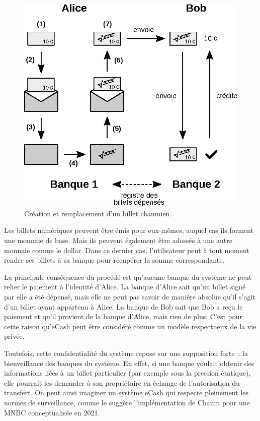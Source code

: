 \begin{figure}[h]
  \centering
  \includegraphics[scale=0.75]{img/chaumian-ecash.eps}
  \caption{Création et remplacement d'un billet chaumien.}
\end{figure}

Les billets numériques peuvent être émis pour eux-mêmes, auquel cas ils forment une monnaie de base. Mais ils peuvent également être adossés à une autre monnaie comme le dollar. Dans ce dernier cas, l'utilisateur peut à tout moment rendre ses billets à sa banque pour récupérer la somme correspondante.

La principale conséquence du procédé est qu'aucune banque du système ne peut relier le paiement à l'identité d'Alice. La banque d'Alice sait qu'un billet signé par elle a été dépensé, mais elle ne peut pas savoir de manière absolue qu'il s'agit d'un billet ayant appartenu à Alice. La banque de Bob sait que Bob a reçu le paiement et qu'il provient de la banque d'Alice, mais rien de plus. C'est pour cette raison qu'eCash peut être considéré comme un modèle respectueux de la vie privée.

Toutefois, cette confidentialité du système repose sur une supposition forte~: la bienveillance des banques du système. En effet, si une banque voulait obtenir des informations liées à un billet particulier (par exemple sous la pression étatique), elle pourrait les demander à son propriétaire en échange de l'autorisation du transfert. On peut ainsi imaginer un système eCash qui respecte pleinement les normes de surveillance, comme le suggère l'implémentation de Chaum pour une MNBC conceptualisée en 2021.

